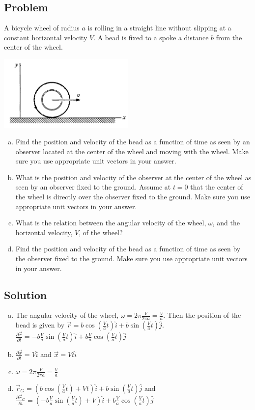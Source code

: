 \documentclass[solutions]{esg8012pset}
\begin{document}
\subsection{Problem}
  A bicycle wheel of radius $a$ is rolling in a straight line without slipping at a constant horizontal
  velocity $V$. A bead is fixed to a spoke a distance $b$ from the center of the wheel.
  \begin{center}\includegraphics[width=0.5\textwidth]{ps01_3}\end{center}
  \begin{enumerate}[a)]
    \item Find the position and velocity of the bead as a function of time as seen by an observer located
  at the center of the wheel and moving with the wheel. Make sure you use appropriate unit
  vectors in your answer.
    \item What is the position and velocity of the observer at the center of the wheel as seen by an
  observer fixed to the ground. Assume at $t = 0$ that the center of the wheel is directly over the
  observer fixed to the ground. Make sure you use appropriate unit vectors in your answer.
    \item What is the relation between the angular velocity of the wheel, $\omega$, and the horizontal velocity, $V$, of the wheel?
    \item Find the position and velocity of the bead as a function of time as seen by the observer fixed
  to the ground. Make sure you use appropriate unit vectors in your answer.
  \end{enumerate}
\subsection{Solution}
  \begin{enumerate}[a)]
    \item The angular velocity of the wheel, $\omega = 2\pi \frac{V}{2\pi a} = \frac{V}{a}$.  Then the position of the bead is given by $\vec r = b\cos\left(\frac{V}{a}t\right)\hat i + b\sin\left(\frac{V}{a}t\right)\hat j$.  $\frac{\partial \vec r}{\partial t} = -b\frac{V}{a}\sin\left(\frac{V}{a}t\right)\hat i + b\frac{V}{a}\cos\left(\frac{V}{a}t\right)\hat j$
    \item $\frac{\partial \vec x}{\partial t} = V\hat i$ and $\vec x = V t\hat i$
    \item $\omega = 2\pi \frac{V}{2\pi a} = \frac{V}{a}$
    \item $\vec r_G = \left(b\cos\left(\frac{V}{a}t\right) + Vt\right)\hat i + b\sin\left(\frac{V}{a}t\right)\hat j$ and $\frac{\partial \vec r_G}{\partial t} = \left(-b\frac{V}{a}\sin\left(\frac{V}{a}t\right) + V\right)\hat i + b\frac{V}{a}\cos\left(\frac{V}{a}t\right)\hat j$
  \end{enumerate}
\end{document}
